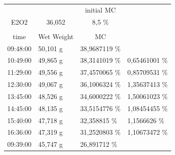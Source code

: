 \begin{table}[h]
	\centering
	\begin{tabular}{llll}
		\cline{3-3}
		&
		\multicolumn{1}{l|}{} &
		\multicolumn{1}{c|}{initial MC} &
		\\ \cline{1-3}
		\multicolumn{1}{|c|}{\cellcolor[HTML]{F8CBAD}E2O2} &
		\multicolumn{1}{c|}{\cellcolor[HTML]{F8CBAD}36,052} &
		\multicolumn{1}{c|}{8,5 \%} &
		\\ \cline{1-3}
		&
		&
		&
		\\ \cline{1-3}
		\multicolumn{1}{|c|}{\cellcolor[HTML]{C0C0C0}time} &
		\multicolumn{1}{c|}{\cellcolor[HTML]{C0C0C0}Wet Weight} &
		\multicolumn{1}{c|}{\cellcolor[HTML]{C0C0C0}MC} &
		\\ \cline{1-3}
		\multicolumn{1}{|l|}{09:48:00} &
		\multicolumn{1}{l|}{50,101 g} &
		\multicolumn{1}{l|}{38,9687119   \%} &
		\\ \hline
		\multicolumn{1}{|l|}{10:49:00} &
		\multicolumn{1}{l|}{49,865 g} &
		\multicolumn{1}{l|}{38,3141019   \%} &
		\multicolumn{1}{l|}{0,65461001 \%} \\ \hline
		\multicolumn{1}{|l|}{11:29:00} &
		\multicolumn{1}{l|}{49,556 g} &
		\multicolumn{1}{l|}{37,4570065   \%} &
		\multicolumn{1}{l|}{0,85709531 \%} \\ \hline
		\multicolumn{1}{|l|}{12:30:00} &
		\multicolumn{1}{l|}{49,067 g} &
		\multicolumn{1}{l|}{36,1006324   \%} &
		\multicolumn{1}{l|}{1,35637413 \%} \\ \hline
		\multicolumn{1}{|l|}{13:45:00} &
		\multicolumn{1}{l|}{48,526 g} &
		\multicolumn{1}{l|}{34,6000222   \%} &
		\multicolumn{1}{l|}{1,50061023 \%} \\ \hline
		\multicolumn{1}{|l|}{14:45:00} &
		\multicolumn{1}{l|}{48,135 g} &
		\multicolumn{1}{l|}{33,5154776   \%} &
		\multicolumn{1}{l|}{1,08454455 \%} \\ \hline
		\multicolumn{1}{|l|}{15:40:00} &
		\multicolumn{1}{l|}{47,718 g} &
		\multicolumn{1}{l|}{32,358815   \%} &
		\multicolumn{1}{l|}{1,1566626 \%} \\ \hline
		\multicolumn{1}{|l|}{16:36:00} &
		\multicolumn{1}{l|}{47,319 g} &
		\multicolumn{1}{l|}{\cellcolor[HTML]{0070C0}31,2520803   \%} &
		\multicolumn{1}{l|}{1,10673472 \%} \\ \hline
		\multicolumn{1}{|l|}{\cellcolor[HTML]{A5A5A5}09:39:00} &
		\multicolumn{1}{l|}{45,747 g} &
		\multicolumn{1}{l|}{26,891712   \%} &
		\\ \hline

\end{tabular}
\end{table}
